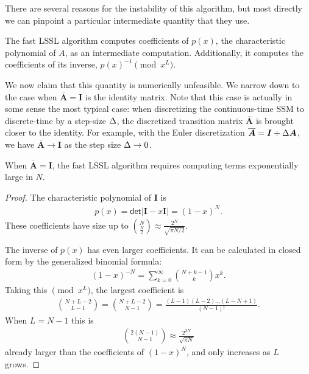 There are several reasons for the instability of this algorithm, but most directly we can pinpoint a particular intermediate quantity that they use.
\begin{definition}%
  The fast LSSL algorithm computes coefficients of \( p(x) \), the characteristic polynomial of \( A \), as an intermediate computation.
  Additionally, it computes the coefficients of its inverse, \( p(x)^{-1} \pmod{x^L} \).
\end{definition}

We now claim that this quantity is numerically unfeasible.
We narrow down to the case when \( \bm{\overline{A}} = \bm{I} \) is the identity matrix.
Note that this case is actually in some sense the most typical case:
when discretizing the continuous-time SSM to discrete-time by a step-size \( \Delta \),
the discretized transition matrix \( \bm{\overline{A}} \) is brought closer to the identity.
For example, with the Euler discretization \( \bm{\overline{A}} = \bm{I} + \Delta \bm{A} \),
we have \( \bm{\overline{A}} \to \bm{I} \) as the step size \( \Delta \to 0 \).

\begin{lemma}%
  When \( \bm{\overline{A}} = \bm{I} \), the fast LSSL algorithm requires computing terms exponentially large in \( N \).
\end{lemma}
\begin{proof}%
  The characteristic polynomial of \( \bm{I} \) is
  \begin{align*}
    p(x) =
    \mathsf{det}\left| \bm{I} - x\bm{I} \right|
    = (1-x)^N.
  \end{align*}
  These coefficients have size up to \( \binom{N}{\frac{N}{2}} \approx \frac{2^N}{\sqrt{\pi N/2}} \).

  The inverse of \( p(x) \) has even larger coefficients.
  It can be calculated in closed form by the generalized binomial formula:
  \begin{align*}
    (1-x)^{-N} = \sum_{k=0}^{\infty} \binom{N+k-1}{k}x^k.
  \end{align*}
  Taking this \( \pmod{x^L} \), the largest coefficient is
  \begin{align*}
    \binom{N+L-2}{L-1} = \binom{N+L-2}{N-1} = \frac{(L-1)(L-2)\dots(L-N+1)}{(N-1)!}.
  \end{align*}
  When \( L=N-1 \) this is
  \begin{align*}
    \binom{2(N-1)}{N-1} \approx \frac{2^{2N}}{\sqrt{\pi N}}
  \end{align*}
  already larger than the coefficients of \( (1-x)^N \), and only increases as \( L \) grows.
\end{proof}

